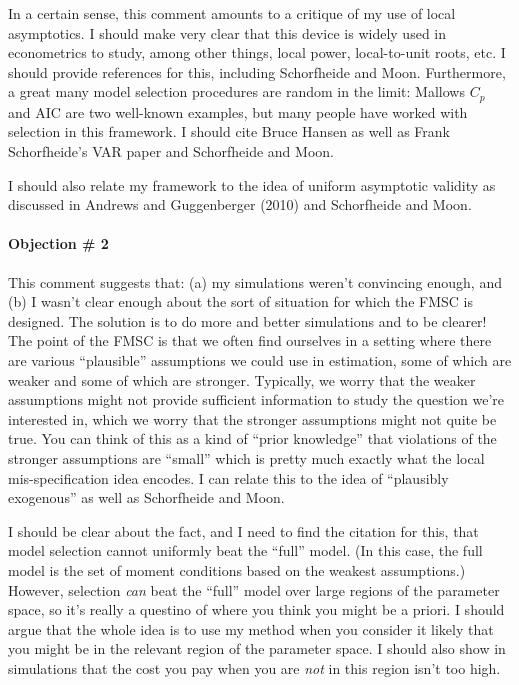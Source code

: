\documentclass[12pt]{article}\usepackage[]{graphicx}\usepackage[]{color}
\theoremstyle{definition}
\begin{document}
In a certain sense, this comment amounts to a critique of my use of local asymptotics. I should make very clear that this device is widely used in econometrics to study, among other things, local power, local-to-unit roots, etc. I should provide references for this, including Schorfheide and Moon. Furthermore, a great many model selection procedures are random in the limit: Mallows $C_p$ and AIC are two well-known examples, but many people have worked with selection in this framework. I should cite Bruce Hansen as well as Frank Schorfheide's VAR paper and Schorfheide and Moon.

I should also relate my framework to the idea of uniform asymptotic validity as discussed in Andrews and Guggenberger (2010) and Schorfheide and Moon.


\paragraph{Objection \# 2} This comment suggests that: (a) my simulations weren't convincing enough, and (b) I wasn't clear enough about the sort of situation for which the FMSC is designed. The solution is to do more and better simulations and to be clearer! The point of the FMSC is that we often find ourselves in a setting where there are various ``plausible'' assumptions we could use in estimation, some of which are weaker and some of which are stronger. Typically, we worry that the weaker assumptions might not provide sufficient information to study the question we're interested in, which we worry that the stronger assumptions might not quite be true. You can think of this as a kind of ``prior knowledge'' that violations of the stronger assumptions are ``small'' which is pretty much exactly what the local mis-specification idea encodes. I can relate this to the idea of ``plausibly exogenous'' as well as Schorfheide and Moon. 

I should be clear about the fact, and I need to find the citation for this, that model selection cannot uniformly beat the ``full'' model. (In this case, the full model is the set of moment conditions based on the weakest assumptions.) However, selection \emph{can} beat the ``full'' model over large regions of the parameter space, so it's really a questino of where you think you might be a priori. I should argue that the whole idea is to use my method when you consider it likely that you might be in the relevant region of the parameter space. I should also show in simulations that the cost you pay when you are \emph{not} in this region isn't too high.
\end{document}
